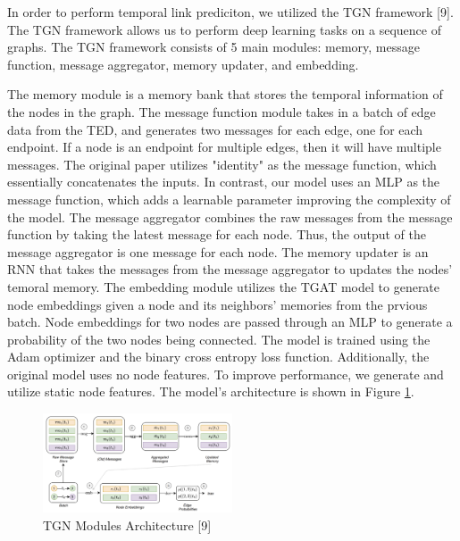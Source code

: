 \documentclass[times, 10pt,twocolumn]{article}
\begin{document}
In order to perform temporal link prediciton, we utilized the TGN framework [9]. The TGN framework allows us to perform deep learning tasks on a sequence of graphs. The TGN framework consists of 5 main modules: memory, message function, message aggregator, memory updater, and embedding.

The memory module is a memory bank that stores the temporal information of the nodes in the graph. The message function module takes in a batch of edge data from the TED, and generates two messages for each edge, one for each endpoint. If a node is an endpoint for multiple edges, then it will have multiple messages. The original paper utilizes "identity" as the message function, which essentially concatenates the inputs. In contrast, our model uses an MLP as the message function, which adds a learnable parameter improving the complexity of the model. The message aggregator combines the raw messages from the message function by taking the latest message for each node. Thus, the output of the message aggregator is one message for each node. The memory updater is an RNN that takes the messages from the message aggregator to updates the nodes' temoral memory. The embedding module utilizes the TGAT model to generate node embeddings given a node and its neighbors' memories from the prvious batch. Node embeddings for two nodes are passed through an MLP to generate a probability of the two nodes being connected. The model is trained using the Adam optimizer and the binary cross entropy loss function. Additionally, the original model uses no node features. To improve performance, we generate and utilize static node features. The model's architecture is shown in Figure \ref{fig:tgn_architecture}.

\begin{figure}[h]
    \centering
    \includegraphics[width=0.50\textwidth]{imgs/tgn_flow.png}
    \caption{TGN Modules Architecture [9]}
    \label{fig:tgn_architecture}
\end{figure}


\end{document}
